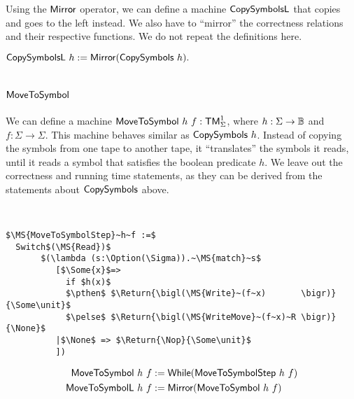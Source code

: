 Using the $\mathsf{Mirror}$ operator, we can define a machine $\MS{CopySymbolsL}$ that copies and goes to the left instead.  We also have to ``mirror''
the correctness relations and their respective functions.  We do not repeat the definitions here.
\begin{definition}[$\MS{CopySymbolsL}$][CopySymbols_L]
  $\mathsf{CopySymbolsL}~h := \mathsf{Mirror}(\mathsf{CopySymbols}~h).$
\end{definition}

\section{$\MS{MoveToSymbol}$}
\label{sec:MoveToSymbol}

\enlargethispage{0.5cm}

We can define a machine $\mathsf{MoveToSymbol}~h~f : \mathsf{TM}_\Sigma^1$, where $h:\Sigma\rightarrow\mathbb{B}$ and $f:\Sigma\to\Sigma$.  This machine behaves similar as
$\mathsf{CopySymbols}~h$.  Instead of copying the symbols from one tape to another tape, it ``translates'' the symbols it reads, until it reads a symbol
that satisfies the boolean predicate $h$.  We leave out the correctness and running time statements, as they can be derived from the statements about
$\mathsf{CopySymbols}$ above.

\begin{definition}[$\MS{MoveToSymbol}$][MoveToSymbol]
  ~
\begin{lstlisting}[style=semicoqstyle]
$\MS{MoveToSymbolStep}~h~f :=$
  Switch$(\MS{Read})$
       $(\lambda (s:\Option(\Sigma)).~\MS{match}~s$
          [$\Some{x}$=> 
            if $h(x)$
            $\pthen$ $\Return{\bigl(\MS{Write}~(f~x)       \bigr)}{\Some\unit}$ 
            $\pelse$ $\Return{\bigl(\MS{WriteMove}~(f~x)~R \bigr)}{\None}$ 
          |$\None$ => $\Return{\Nop}{\Some\unit}$ 
          ])
\end{lstlisting}
  \begin{align*}
    \mathsf{MoveToSymbol }~h~f &:= \mathsf{While}(\mathsf{MoveToSymbolStep}~h~f) \\
    \mathsf{MoveToSymbolL}~h~f &:= \mathsf{Mirror}(\mathsf{MoveToSymbol}~h~f)
  \end{align*}
\end{definition}



